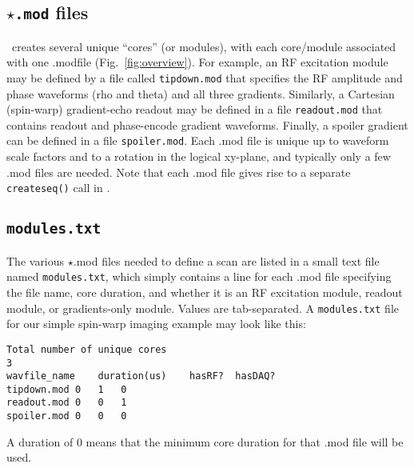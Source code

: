 \subsection{ {\tt $\star$.mod} files}
\toppe~creates several unique ``cores'' (or modules), with each core/module associated with one .modfile (Fig.~\ref{fig:overview}).
For example, an RF excitation module may be defined by a file called {\tt tipdown.mod} that specifies the RF amplitude and phase waveforms (rho and theta) and all three gradients.
Similarly, a Cartesian (spin-warp) gradient-echo readout may be defined in a file {\tt readout.mod} that contains readout and phase-encode gradient waveforms.
Finally, a spoiler gradient can be defined in a file {\tt spoiler.mod}.
Each .mod file is unique up to waveform scale factors and to a rotation in the logical xy-plane, and typically only a few .mod files are needed.
Note that each .mod file gives rise to a separate {\tt createseq()} call in \toppe.

\subsection{\tt modules.txt}
The various $\star$.mod files needed to define a scan are listed in a small text file named {\tt modules.txt}, which simply contains a line for each .mod file specifying the file name, core duration, and whether it is an RF excitation module, readout module, or gradients-only module.
Values are tab-separated.
A {\tt modules.txt} file for our simple spin-warp imaging example may look like this:
\begin{lstlisting}
Total number of unique cores
3
wavfile_name	duration(us)	hasRF?	hasDAQ?
tipdown.mod	0	1	0
readout.mod	0	0	1
spoiler.mod	0	0	0
\end{lstlisting}
A duration of 0 means that the minimum core duration for that .mod file will be used.

